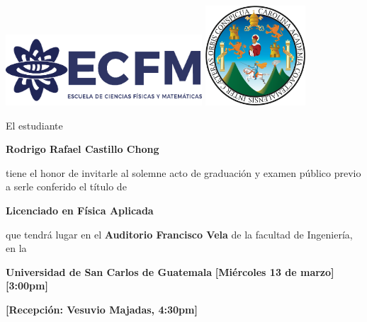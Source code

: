 \documentclass[letterpaper,12pt]{article}
\begin{document}
\pagestyle{empty}



\begin{center}
	\includegraphics[width=0.55\textwidth]{1.png}\hfill
    \includegraphics[width=0.28\textwidth]{usaclogo.png}

    \vspace{1cm}

    {\large El estudiante}

    \vspace{1cm}
    \textbf{\Large Rodrigo Rafael Castillo Chong}

    \vspace{1cm}
\large
    {tiene el honor de invitarle al solemne acto de graduación y examen público previo a serle conferido el título de}

    \vspace{1cm}
    \textbf{\Large Licenciado en Física Aplicada}

    \vspace{1cm}
    {\large que tendrá lugar en el \textbf{Auditorio Francisco Vela} de la facultad de Ingeniería, en la }

    \vspace{1cm}
    {\Large \textbf{Universidad de San Carlos de Guatemala}}
    \vspace{1cm}
    \textbf{\large [Miércoles 13 de marzo] \hspace{0.5cm} [3:00pm]}

    \vspace{1cm}
    \textbf{\large [Recepción: Vesuvio Majadas, 4:30pm]}

\end{center}
\end{document}
